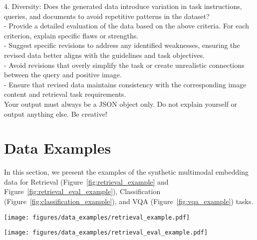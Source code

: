 \begin{figure*}[t]
\begin{prompt}[title={Prompt: Synthesizing Retrieval Data (With Document Images)}, label=prompt:ret_three_image]
  4. Diversity: Does the generated data introduce variation in task instructions, queries, and documents to avoid repetitive patterns in the dataset?\\
- Provide a detailed evaluation of the data based on the above criteria. For each criterion, explain specific flaws or strengths.\\
- Suggest specific revisions to address any identified weaknesses, ensuring the revised data better aligns with the guidelines and task objectives.\\
- Avoid revisions that overly simplify the task or create unrealistic connections between the query and positive image.\\
- Ensure that revised data maintains consistency with the corresponding image content and retrieval task requirements.\\

Your output must always be a JSON object only. Do not explain yourself or output anything else. Be creative!
    
\end{prompt}
\end{figure*}



\section{Data Examples}
\label{appendix: examples}

In this section, we present the examples of the synthetic multimodal embedding data for Retrieval (Figure~\ref{fig:retrieval_example} and Figure~\ref{fig:retrieval_eval_example}), Classification (Figure~\ref{fig:classification_example}), and VQA (Figure~\ref{fig:vqa_example}) tasks.

\begin{figure*}[p]
	\centering
	\texttt{[image: figures/data\_examples/retrieval\_example.pdf]}%
	\caption{An example of the synthetic Retrieval IT2IT data (part 1). This part includes the input images, the multi-aspect descriptions, and the initially generated data.}
	\vspace{-2ex}
	\label{fig:retrieval_example}
\end{figure*}



\begin{figure*}[p]
	\centering
	\texttt{[image: figures/data\_examples/retrieval\_eval\_example.pdf]}%
	\caption{An example of the synthetic Retrieval IT2IT data (part 2). This part includes the evaluation, possible improvements, and the revised data.}
	\vspace{-2ex}
	\label{fig:retrieval_eval_example}
\end{figure*}



